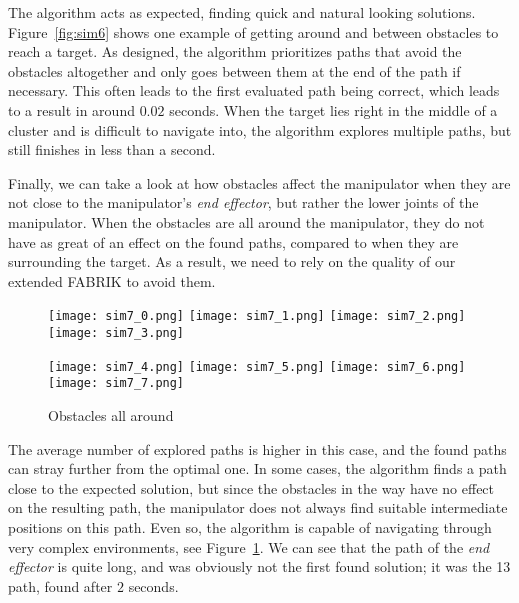 The algorithm acts as expected, finding quick and natural looking solutions. Figure~\ref{fig:sim6} shows one example of getting around and between obstacles to reach a target. As designed, the algorithm prioritizes paths that avoid the obstacles altogether and only goes between them at the end of the path if necessary. This often leads to the first evaluated path being correct, which leads to a result in around $0.02$ seconds. When the target lies right in the middle of a cluster and is difficult to navigate into, the algorithm explores multiple paths, but still finishes in less than a second.

Finally, we can take a look at how obstacles affect the manipulator when they are not close to the manipulator's \textit{end effector}, but rather the lower joints of the manipulator. When the obstacles are all around the manipulator, they do not have as great of an effect on the found paths, compared to when they are surrounding the target. As a result, we need to rely on the quality of our extended FABRIK to avoid them.

\begin{figure}
  \centering
  \begin{minipage}{\textwidth}
    \texttt{[image: sim7\_0.png]}
    \texttt{[image: sim7\_1.png]}
    \texttt{[image: sim7\_2.png]}
    \texttt{[image: sim7\_3.png]}

    \texttt{[image: sim7\_4.png]}
    \texttt{[image: sim7\_5.png]}
    \texttt{[image: sim7\_6.png]}
    \texttt{[image: sim7\_7.png]}
  \end{minipage}
  \caption{Obstacles all around}\label{fig:sim7}
\end{figure}

The average number of explored paths is higher in this case, and the found paths can stray further from the optimal one. In some cases, the algorithm finds a path close to the expected solution, but since the obstacles in the way have no effect on the resulting path, the manipulator does not always find suitable intermediate positions on this path. Even so, the algorithm is capable of navigating through very complex environments, see Figure~\ref{fig:sim7}. We can see that the path of the \textit{end effector} is quite long, and was obviously not the first found solution; it was the 13\th{} path, found after $2$ seconds.

